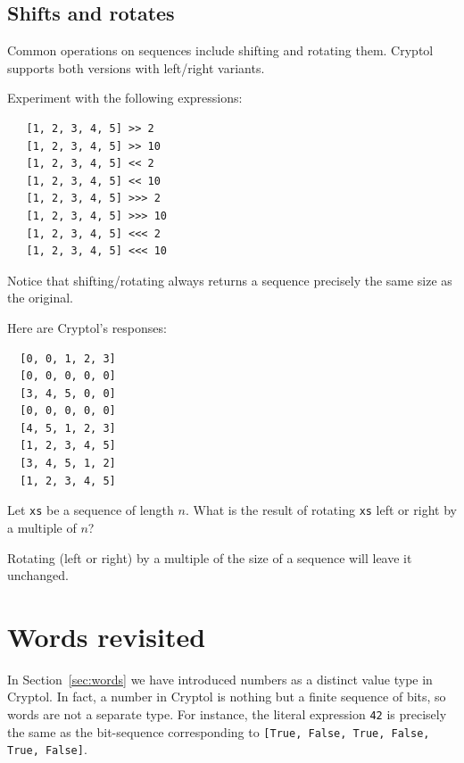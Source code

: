 \subsection{Shifts and rotates} 
\label{sec:shifts-rotates}

Common operations on sequences include shifting and rotating them.
Cryptol supports both versions with left/right
variants.\indShiftLeft\indShiftRight\indRotLeft\indRotRight
\begin{Exercise}\label{ex:seq:14}
Experiment with the following expressions:
\begin{Verbatim}
   [1, 2, 3, 4, 5] >> 2
   [1, 2, 3, 4, 5] >> 10
   [1, 2, 3, 4, 5] << 2
   [1, 2, 3, 4, 5] << 10
   [1, 2, 3, 4, 5] >>> 2
   [1, 2, 3, 4, 5] >>> 10
   [1, 2, 3, 4, 5] <<< 2
   [1, 2, 3, 4, 5] <<< 10
\end{Verbatim}
\noindent Notice that shifting/rotating always returns a sequence
precisely the same size as the original.
\end{Exercise}
\begin{Answer}
Here are Cryptol's responses:
\begin{Verbatim}
  [0, 0, 1, 2, 3]
  [0, 0, 0, 0, 0]
  [3, 4, 5, 0, 0]
  [0, 0, 0, 0, 0]
  [4, 5, 1, 2, 3]
  [1, 2, 3, 4, 5]
  [3, 4, 5, 1, 2]
  [1, 2, 3, 4, 5]
\end{Verbatim}
\end{Answer}
\begin{Exercise}\label{ex:seq:15}
  Let {\tt xs} be a sequence of length $n$. What is the result of
  rotating {\tt xs} left or right by a multiple of $n$?
\end{Exercise}
\begin{Answer}
  Rotating (left or right) by a multiple of the size of a sequence
  will leave it unchanged.
\end{Answer}

\section{Words revisited}
\label{sec:words2}

In Section~\ref{sec:words} we have introduced numbers as a distinct
value type in Cryptol. In fact, a number in Cryptol is nothing but a
finite sequence of bits, so words are not a separate type. For
instance, the literal expression {\tt 42} is precisely the same as the
bit-sequence corresponding to {\tt [True, False, True, False, True,
  False]}.\indTheWordType

